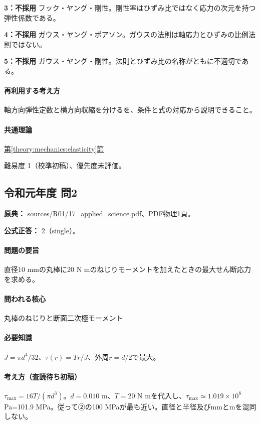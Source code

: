 \noindent\textbf{3：不採用} フック・ヤング・剛性。剛性率はひずみ比ではなく応力の次元を持つ弾性係数である。\par

\noindent\textbf{4：不採用} ガウス・ヤング・ポアソン。ガウスの法則は軸応力とひずみの比例法則ではない。\par

\noindent\textbf{5：不採用} ガウス・ヤング・剛性。法則とひずみ比の名称がともに不適切である。\par

\paragraph{再利用する考え方} 軸方向弾性定数と横方向収縮を分けるを、条件と式の対応から説明できること。

\paragraph{共通理論} \hyperref[theory:mechanics:elasticity]{第\ref*{theory:mechanics:elasticity}節}

\par 難易度 1（校準初稿）、優先度未評価。

\subsection{令和元年度 問2}
\label{q:r01-reg-applied-02}

\noindent\textbf{原典：} sources/R01/17\_applied\_science.pdf、PDF物理1頁。

\textbf{公式正答：} 2（single）。

\paragraph{問題の要旨} 直径10 mmの丸棒に20 N mのねじりモーメントを加えたときの最大せん断応力を求める。

\paragraph{問われる核心} 丸棒のねじりと断面二次極モーメント

\paragraph{必要知識} \(J=\pi d^4/32\)、\(\tau(r)=Tr/J\)、外周\(r=d/2\)で最大。

\paragraph{考え方（査読待ち初稿）} \(\tau_{\max}=16T/(\pi d^3)\)。\(d=0.010\) m、\(T=20\) N mを代入し、\(\tau_{\max}\simeq1.019\times10^8\) Pa=101.9 MPa。従って②の100 MPaが最も近い。直径と半径及びmmとmを混同しない。


